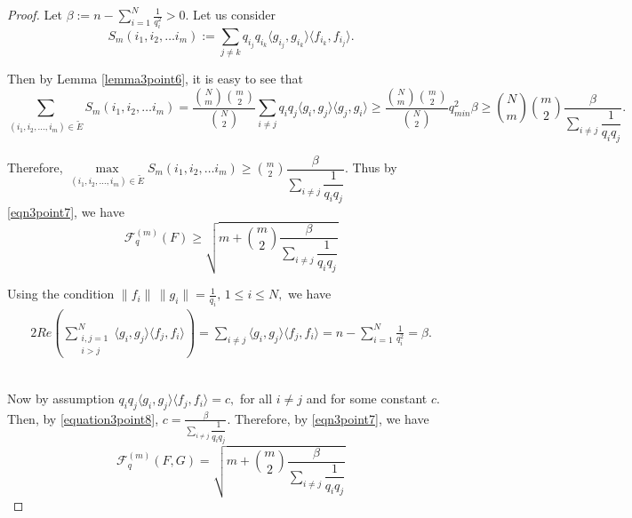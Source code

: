\documentclass[final,1p,times]{elsarticle}
\begin{document}
\begin{proof}
Let  $\beta := n -\displaystyle{\sum_{i=1}^N \frac{1}{q_{i}^2}} >0.$  Let us consider
$$  S_{m}(i_1,i_2,\ldots i_m) := \sum\limits_{j\neq k} q_{i_j} q_{i_k} \langle g_{i_j}, g_{i_k} \rangle \langle f_{i_k}, f_{i_j} \rangle .$$

Then by Lemma \ref{lemma3point6}, it is easy to see that 
$$\sum\limits_{(i_1,i_2,\ldots,i_m)\in \tilde{E}} S_{m}(i_1,i_2,\ldots i_m) = \dfrac{{{N}\choose{m}}{{m}\choose{2}}}{{{N}\choose{2}}} \sum\limits_{i\neq j} q_i q_j \langle g_i, g_j \rangle \langle g_j, g_i \rangle \geq \dfrac{{{N}\choose{m}}{{m}\choose{2}}}{{{N}\choose{2}}} q_{min}^2 \beta \geq {{N}\choose{m}}{{m}\choose{2}}  \dfrac{\beta}{\sum\limits_{i\neq j}{\dfrac{1}{q_i q_j}}}.$$

Therefore, $\max\limits_{(i_1,i_2,\ldots,i_m)\in \tilde{E}} S_{m}(i_1,i_2,\ldots i_m) \geq  {{m}\choose{2}}  \dfrac{\beta}{\sum\limits_{i\neq j}{\dfrac{1}{q_i q_j}}}.$ Thus by \eqref{eqn3point7}, we have 
$$ \mathcal{F}_{q}^{(m)} (F) \geq 
				\sqrt{m + {{m}\choose{2}}\dfrac{\beta}{\sum\limits_{i\neq j}\dfrac{1}{q_i q_j}}}$$






  
  
  Using the condition $\|f_i\|\,\|g_i\| = \frac{1}{q_i},\, 1\leq i \leq N,$ we have
  \begin{align}\label{equation3point8}
        2 Re \displaystyle{\left( \sum_{\substack{ i, j =1\\ i >j}}^N \langle g_i, g_j \rangle \langle f_j, f_i \rangle  \right)} = \sum\limits_{i \neq j}\langle g_i, g_j \rangle \langle f_j, f_i \rangle =n -\displaystyle{\sum_{i=1}^N \frac{1}{q_{i}^2}} = \beta.
  \end{align} \\
 
  
\par Now by assumption  $q_i q_j \langle g_i, g_j \rangle \langle f_j, f_i \rangle = c,$  for all $i \neq j$ and for some constant $c.$ Then, by \eqref{equation3point8},   $c= \frac{\beta}{\sum\limits_{i\neq j}\dfrac{1}{q_i q_j}}.$ Therefore, by \eqref{eqn3point7}, we have 
$$\mathcal{F}_{q}^{(m)} (F,G) =
				\sqrt{m + {{m}\choose{2}}\dfrac{\beta}{\sum\limits_{i\neq j}\dfrac{1}{q_i q_j}}}$$
 
\end{proof}
\end{document}
